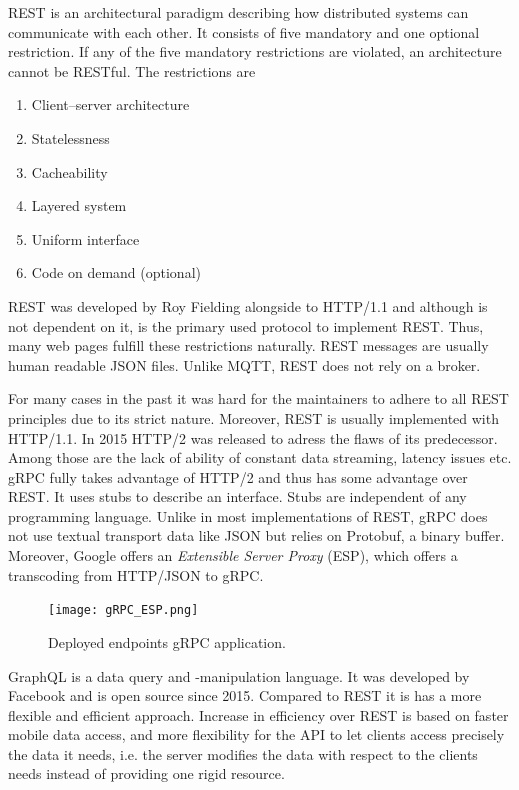REST is an architectural paradigm describing how distributed systems can communicate with each other. It consists of five mandatory and one optional restriction. If any of the five mandatory restrictions are violated, an architecture cannot be RESTful. The restrictions are 
\begin{enumerate}
    \item Client–server architecture
    \item Statelessness
    \item Cacheability
    \item Layered system
    \item Uniform interface
    \item Code on demand (optional)
\end{enumerate}
REST was developed by Roy Fielding alongside to HTTP/1.1 and although is not dependent on it, is the primary used protocol to implement REST. Thus, many web pages fulfill these restrictions naturally. REST messages are usually human readable JSON files. Unlike MQTT, REST does not rely on a broker.  \cite{Fielding2000ArchitecturalArchitectures} \newline

For many cases in the past it was hard for the maintainers to adhere to all REST principles due to its strict nature. Moreover, REST is usually implemented with HTTP/1.1. In 2015 HTTP/2 was released to adress the flaws of its predecessor. \cite{SayfanLastvisited2018-11-242018RESTAPIs} Among those are the lack of ability of constant data streaming, latency issues etc. gRPC fully takes advantage of HTTP/2 and thus has some advantage over REST. It uses stubs to describe an interface. Stubs are independent of any programming language. Unlike in most implementations of REST, gRPC does not use textual transport data like JSON but relies on Protobuf, a binary buffer. Moreover, Google offers an \textit{Extensible Server Proxy} (ESP), which offers a transcoding from HTTP/JSON to gRPC. \cite{2018-11-242017Grpc-gateway, Lastvisited2018-11-272018CloudGRPC} \newline

\begin{figure}[ht]
	\centering
  \texttt{[image: gRPC\_ESP.png]}
	\caption{Deployed endpoints gRPC application. \cite{Lastvisited2018-11-272018CloudGRPC}}
	\label{ESP}
\end{figure}

GraphQL is a data query and -manipulation language. It was developed by Facebook and is open source since 2015. Compared to REST it is has a more flexible and efficient approach. Increase in efficiency over REST is based on faster mobile data access, and more flexibility for the API to let clients access precisely the data it needs,  i.e. the server modifies the data with respect to the clients needs instead of providing one rigid resource. \cite{LastVisited2018-15-122018BasicsIntroduction} 

